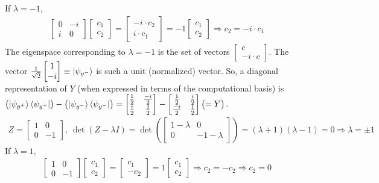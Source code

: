 If $\lambda = -1$,
\begin{align*}
	\begin{bmatrix}
		0 & -i \\
		i & 0
	\end{bmatrix}
	\begin{bmatrix}
		c_1 \\
		c_2
	\end{bmatrix} =
	\begin{bmatrix}
	      -i\cdot c_2 \\
	      i\cdot c_1
	\end{bmatrix} =
	 -1
	\begin{bmatrix}
		c_1 \\
		c_2
	\end{bmatrix}
	\Rightarrow c_2 = -i\cdot c_1
\end{align*}
The eigenspace corresponding to $\lambda = -1$ is the set of vectors $\begin{bmatrix}c \\ -i\cdot c\end{bmatrix}$.  The vector $\frac{1}{\sqrt{2}}\begin{bmatrix} 1 \\ -i\end{bmatrix}\equiv\ket{\psi_{y^-}}$ is such a unit (normalized) vector.  So, a diagonal representation of $Y$ (when expressed in terms of the computational basis) is $\bigl(\ket{\psi_{y^+}}\bra{\psi_{y^+}}\bigr) - \bigl(\ket{\psi_{y^-}}\bra{\psi_{y^-}}\bigr) = \begin{bmatrix}\frac{1}{2} & \frac{-i}{2} \\ \frac{i}{2} & \frac{1}{2}\end{bmatrix} - \begin{bmatrix}\frac{1}{2} & \frac{i}{2} \\ \frac{-i}{2} & \frac{1}{2}\end{bmatrix} \bigl( = Y\bigr)$.
\begin{align*}
	Z = \begin{bmatrix}
	1 & 0 \\
	0 & -1
	\end{bmatrix},\ \det(Z-\lambda I) =
	\det \left(\begin{bmatrix}
	1-\lambda & 0 \\
	0 & -1-\lambda
	\end{bmatrix} \right) = (\lambda+1)(\lambda- 1) = 0 \Rightarrow \lambda = \pm 1
\end{align*}
If $\lambda = 1$,
\begin{align*}
	\begin{bmatrix}
		1 & 0 \\
		0 & -1
	\end{bmatrix}
	\begin{bmatrix}
		c_1 \\
		c_2
	\end{bmatrix} =
	\begin{bmatrix}
	      c_1 \\
	      -c_2
	\end{bmatrix} =
	 1
	\begin{bmatrix}
		c_1 \\
		c_2
	\end{bmatrix}
	\Rightarrow c_2 = -c_2 \Rightarrow c_2 = 0
\end{align*}
